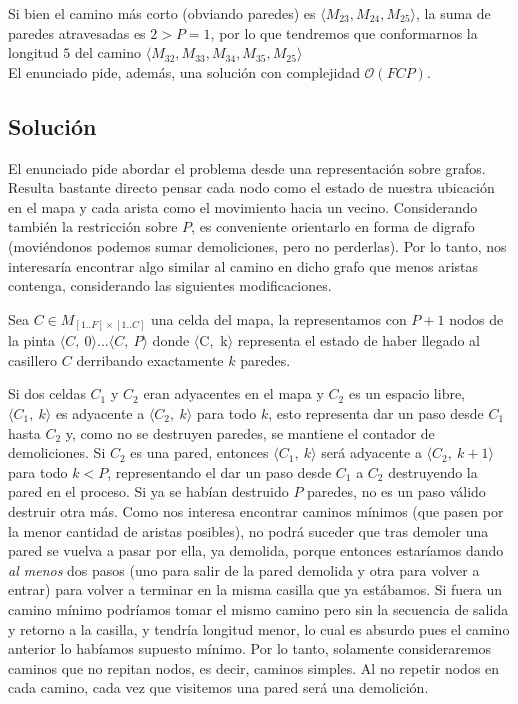 Si bien el camino más corto (obviando paredes) es $\langle {M_{23}, M_{24}, M_{25}} \rangle$, la suma de paredes atravesadas es $2 > P = 1$, por lo que tendremos que conformarnos la longitud $5$ del camino  $\langle {M_{32}, M_{33}, M_{34}, M_{35}, M_{25}} \rangle$
\\

El enunciado pide, además, una solución con complejidad $\mathcal{O}(FCP)$.

\subsection{Solución}

El enunciado pide abordar el problema desde una representación sobre grafos. Resulta bastante directo pensar cada nodo como el estado de nuestra ubicación en el mapa y cada arista como el movimiento hacia un vecino. Considerando también la restricción sobre $P$, es conveniente orientarlo en forma de digrafo (moviéndonos podemos sumar demoliciones, pero no perderlas). Por lo tanto, nos interesaría encontrar algo similar al camino en dicho grafo que menos aristas contenga, considerando las siguientes modificaciones.

Sea $C \in M_{[1..F]\times[1..C]}$ una celda del mapa, la representamos con $P+1$ nodos de la pinta $ \langle {C,\ 0} \rangle ... \langle {C,\ P} \rangle$ donde $\langle $C,\ k$ \rangle$ representa el estado de haber llegado al casillero $C$ derribando exactamente $k$ paredes.

Si dos celdas $C_1$ y $C_2$ eran adyacentes en el mapa y $C_2$ es un espacio libre, $\langle {C_1,\ k} \rangle$ es adyacente a $\langle {C_2,\ k} \rangle$ para todo $k$, esto representa dar un paso desde $C_1$ hasta $C_2$ y, como no se destruyen paredes, se mantiene el contador de demoliciones. Si $C_2$ es una pared, entonces $\langle {C_1,\ k} \rangle$ será adyacente a $\langle {C_2,\ k+1} \rangle$ para todo $k < P$, representando el dar un paso desde $C_1$ a $C_2$ destruyendo la pared en el proceso. Si ya se habían destruido $P$ paredes, no es un paso válido destruir otra más.
Como nos interesa encontrar caminos mínimos (que pasen por la menor cantidad de aristas posibles), no podrá suceder que tras demoler una pared se vuelva a pasar por ella, ya demolida, porque entonces estaríamos dando \emph{al menos} dos pasos (uno para salir de la pared demolida y otra para volver a entrar) para volver a terminar en la misma casilla que ya estábamos. Si fuera un camino mínimo podríamos tomar el mismo camino pero sin la secuencia de salida y retorno a la casilla, y tendría longitud menor, lo cual es absurdo pues el camino anterior lo habíamos supuesto mínimo. Por lo tanto, solamente consideraremos caminos que no repitan nodos, es decir, caminos simples.
Al no repetir nodos en cada camino, cada vez que visitemos una pared será una demolición.

